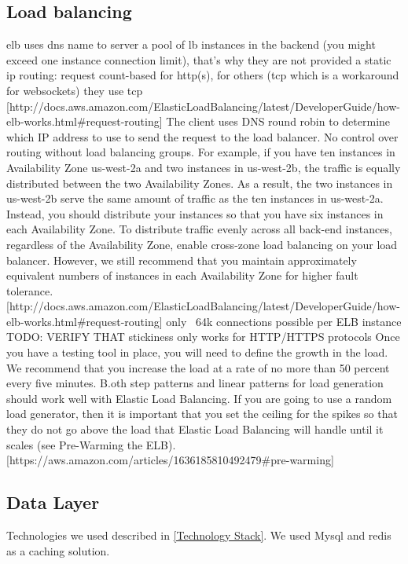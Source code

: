 \documentclass{uvamscse}
\begin{document}
\subsection{Load balancing}
  elb uses dns name to server a pool of lb instances in the backend (you might exceed one instance connection limit), that's why they are not provided a static ip
  routing: request count-based for http(s), for others (tcp which is a workaround for websockets) they use tcp [http://docs.aws.amazon.com/ElasticLoadBalancing/latest/DeveloperGuide/how-elb-works.html\#request-routing]
  The client uses DNS round robin to determine which IP address to use to send the request to the load balancer. No control over routing without load balancing groups.
  For example, if you have ten instances in Availability Zone us-west-2a and two instances in us-west-2b, the traffic is equally distributed between the two Availability Zones. As a result, the two instances in us-west-2b serve the same amount of traffic as the ten instances in us-west-2a. Instead, you should distribute your instances so that you have six instances in each Availability Zone.
  To distribute traffic evenly across all back-end instances, regardless of the Availability Zone, enable cross-zone load balancing on your load balancer. However, we still recommend that you maintain approximately equivalent numbers of instances in each Availability Zone for higher fault tolerance.
  [http://docs.aws.amazon.com/ElasticLoadBalancing/latest/DeveloperGuide/how-elb-works.html\#request-routing]
  only ~64k connections possible per ELB instance TODO: VERIFY THAT
  stickiness only works for HTTP/HTTPS protocols
  Once you have a testing tool in place, you will need to define the growth in the load. We recommend that you increase the load at a rate of no more than 50 percent every five minutes. B.oth step patterns and linear patterns for load generation should work well with Elastic Load Balancing. If you are going to use a random load generator, then it is important that you set the ceiling for the spikes so that they do not go above the load that Elastic Load Balancing will handle until it scales (see Pre-Warming the ELB).
  [https://aws.amazon.com/articles/1636185810492479\#pre-warming]

\subsection{Data Layer}

Technologies we used described in \ref{Technology Stack}. We used Mysql and redis as a caching solution.
\end{document}

